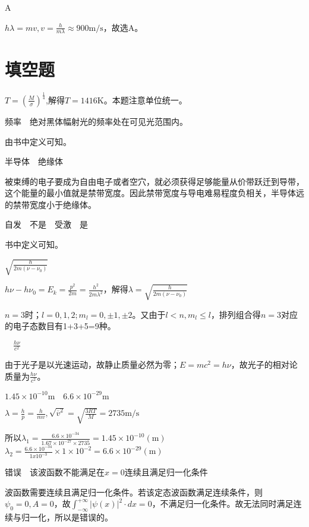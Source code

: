 \exercise A

\solve $h\lambda=mv,v=\frac{h}{m\lambda}\approx900\mathrm{m/s}$，故选A。

\section{填空题}


\solve $T=(\frac{M}{\sigma})^\frac{1}{4}$,解得$T=1416\mathrm{K}$。本题注意单位统一。

\exercise 频率$\quad$绝对黑体幅射光的频率处在可见光范围内。

\solve 由书中定义可知。

\exercise 半导体$\quad$绝缘体

\solve 被束缚的电子要成为自由电子或者空穴，就必须获得足够能量从价带跃迁到导带，这个能量的最小值就是禁带宽度。因此禁带宽度与导电难易程度负相关，半导体远的禁带宽度小于绝缘体。

\exercise 自发$\quad$不是$\quad$受激$\quad$是

\solve 书中定义可知。

\exercise $\sqrt{\frac{h}{2m(\nu-\nu_0)}}$

\solve $h\nu-h\nu_0=E_k=\frac{p^2}{2m}=\frac{h^2}{2m\lambda^2}$，解得$\lambda=\sqrt{\frac{h}{2m(\nu-\nu_0)}}$


\solve $n=3$时；$l=0,1,2;m_l=0,\pm1,\pm2$。又由于$l<n,m_l\le l$，排列组合得$n=3$对应的电子态数目有1+3+5=9种。

$\quad\frac{h\nu}{c^2}$

\solve 由于光子是以光速运动，故静止质量必然为零；$E=mc^2=h\nu$，故光子的相对论质量为$\frac{h\nu}{c^2}$。

\exercise $1.45\times10^{-10}\mathrm{m}\quad6.6\times10^{-29}\mathrm{m}$

\solve$\lambda=\frac{h}{p}=\frac{h}{mv},\sqrt{\overline{v}^2}=\sqrt{\frac{3RT}{M}}=2735\mathrm{m/s}$

所以$\lambda_1=\frac{6.6\times10^{-34}}{1.67\times10^{-27}\times2735}=1.45\times10^{-10}(\mathrm{m})$
$\lambda_2=\frac{6.6\times10^{-34}}{1x10^{-3}}\times1\times10^{-2}=6.6\times10^{-29}(\mathrm{m})$

\exercise 错误$\quad$该波函数不能满足在$x=0$连续且满足归一化条件

\solve 波函数需要连续且满足归一化条件。若该定态波函数满足连续条件，则$\psi_0=0,A=0$，故$  \int_{-\infty}^{+\infty}|\psi(x)|^2\cdot dx=0$，不满足归一化条件。故无法同时满足连续与归一化，所以是错误的。

